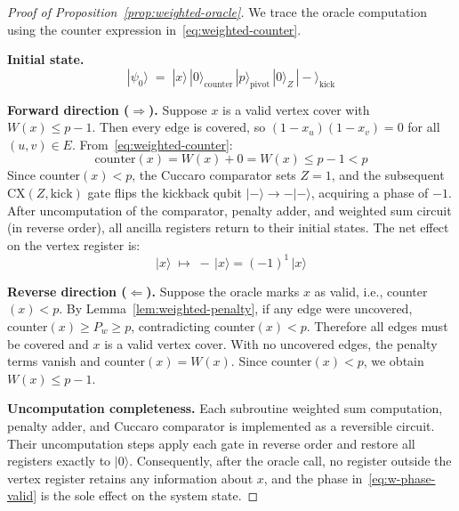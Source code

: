 \documentclass{ieeeaccess}
\newenvironment{prf}{\begin{proof}}{\end{proof}}
\begin{document}
\begin{prf}[Proof of Proposition~\ref{prop:weighted-oracle}]
We trace the oracle computation using the counter expression
in~\eqref{eq:weighted-counter}.

\medskip
\noindent\textbf{Initial state.}
\begin{equation}
    |\psi_0\rangle
    \;=\;
    |x\rangle\,|0\rangle_{\mathrm{counter}}\,
    |p\rangle_{\mathrm{pivot}}\,
    |0\rangle_{Z}\,|-\rangle_{\mathrm{kick}}
    \label{eq:w-psi0}
\end{equation}

\medskip
\noindent\textbf{Forward direction ($\Rightarrow$).}
Suppose $x$ is a valid vertex cover with $W(x) \leq p-1$.
Then every edge is covered, so $(1-x_u)(1-x_v) = 0$ for all
$(u,v) \in E$. From~\eqref{eq:weighted-counter}:
\begin{equation}
    \mathrm{counter}(x)
    = W(x) + 0
    = W(x)
    \leq p - 1
    < p
    \label{eq:w-forward}
\end{equation}
Since counter$(x) < p$, the Cuccaro comparator sets $Z = 1$,
and the subsequent $\mathrm{CX}(Z,\mathrm{kick})$ gate
flips the kickback qubit $|-\rangle \to -|-\rangle$,
acquiring a phase of $-1$. After uncomputation of the
comparator, penalty adder, and weighted sum circuit (in
reverse order), all ancilla registers return to their
initial states. The net effect on the vertex register is:
\begin{equation}
    |x\rangle \;\longmapsto\; -\,|x\rangle
    = (-1)^{1}\,|x\rangle
    \label{eq:w-phase-valid}
\end{equation}

\medskip
\noindent\textbf{Reverse direction ($\Leftarrow$).}
Suppose the oracle marks $x$ as valid, i.e.,
counter$(x) < p$. By Lemma~\ref{lem:weighted-penalty}, if
any edge were uncovered, counter$(x) \geq P_w \geq p$,
contradicting counter$(x) < p$. Therefore all edges must be
covered and $x$ is a valid vertex cover. With no uncovered
edges, the penalty terms vanish and counter$(x) = W(x)$.
Since counter$(x) < p$, we obtain $W(x) \leq p - 1$.

\medskip
\noindent\textbf{Uncomputation completeness.}
Each subroutine weighted sum computation, penalty adder,
and Cuccaro comparator is implemented as a reversible
circuit. Their uncomputation steps apply each gate in
reverse order and restore all registers exactly to
$|0\rangle$. Consequently, after the oracle call, no
register outside the vertex register retains any information
about $x$, and the phase in~\eqref{eq:w-phase-valid} is the
sole effect on the system state.
\end{prf}
\end{document}
